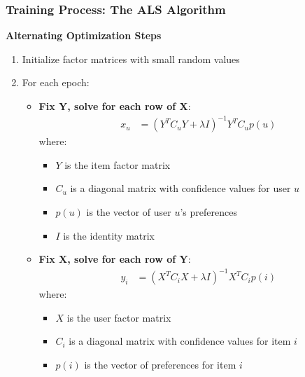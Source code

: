 \documentclass{beamer}
\begin{document}
\begin{frame}
\frametitle{Training Process: The ALS Algorithm}
\textbf{Alternating Optimization Steps}
\begin{enumerate}
    \item Initialize factor matrices with small random values
    \item For each epoch:
    \begin{itemize}
        \item \textbf{Fix Y, solve for each row of X}:
        \begin{align*}
        x_u &= (Y^T C_u Y + \lambda I)^{-1} Y^T C_u p(u)
        \end{align*}
        where:
        \begin{itemize}
            \item $Y$ is the item factor matrix
            \item $C_u$ is a diagonal matrix with confidence values for user $u$
            \item $p(u)$ is the vector of user $u$'s preferences
            \item $I$ is the identity matrix
        \end{itemize}
        
        \item \textbf{Fix X, solve for each row of Y}:
        \begin{align*}
        y_i &= (X^T C_i X + \lambda I)^{-1} X^T C_i p(i)
        \end{align*}
        where:
        \begin{itemize}
            \item $X$ is the user factor matrix
            \item $C_i$ is a diagonal matrix with confidence values for item $i$
            \item $p(i)$ is the vector of preferences for item $i$
        \end{itemize}
    \end{itemize}
\end{enumerate}
\end{frame}
\end{document}
